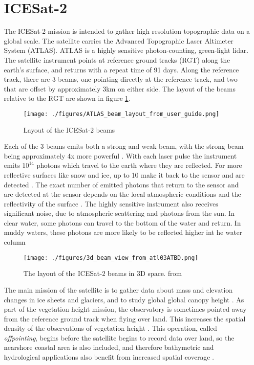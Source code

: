 \section{ICESat-2}

The ICESat-2 mission is intended to gather high resolution topographic data on a global scale. The satellite carries the Advanced Topographic Laser Altimeter System (ATLAS). ATLAS is a highly sensitive photon-counting, green-light lidar. The satellite instrument points at reference ground tracks (RGT) along the earth's surface, and returns with a repeat time of 91 days. Along the reference track, there are 3 beams, one pointing directly at the reference track, and two that are offset by approximately 3km on either side. The layout of the beams relative to the RGT are shown in figure \ref{fig:icesat-rgts}.

\begin{figure}[h!]
      \centering
      \texttt{[image: ./figures/ATLAS\_beam\_layout\_from\_user\_guide.png]}
      \caption{Layout of the ICESat-2 beams}
      \label{fig:icesat-rgts}
\end{figure}

Each of the 3 beams emits both a strong and weak beam, with the strong beam being approximately 4x more powerful \parencite{Neumann2019d}. With each laser pulse the instrument emits \(10^{14}\) photons which travel to the earth where they are reflected. For more reflective surfaces like snow and ice, up to 10 make it back to the sensor and are detected \parencite{Neumann2019d}. The exact number of emitted photons that return to the sensor and are detected at the sensor depends on the local atmospheric conditions and the reflectivity of the surface \parencite{Neumann2019e}. The highly sensitive instrument also receives significant noise, due to atmospheric scattering and photons from the sun. In clear water, some photons can travel to the bottom of the water and return. In muddy waters, these photons are more likely to be reflected higher int he water column \parencite{Ranndal2021}

\begin{figure}[htbp]
      \centering
      \texttt{[image: ./figures/3d\_beam\_view\_from\_atl03ATBD.png]}
      \caption{The layout of the ICESat-2 beams in 3D space. from \cite{Neumann2019d}}
      \label{3d-beams}
\end{figure}


The main mission of the satellite is to gather data about mass and elevation changes in ice sheets and glaciers, and to study global global canopy height \parencite{Markus2017}. As part of the vegetation height mission, the observatory is sometimes pointed away from the reference ground track when flying over land. This increases the spatial density of the observations of vegetation height \parencite{Markus2017}. This operation, called  \emph{offpointing}, begins before the satellite begins to record data over land, so the nearshore coastal area is also included, and therefore bathymetric and hydrological applications also benefit from increased spatial coverage \parencite{Magruder2021}.


